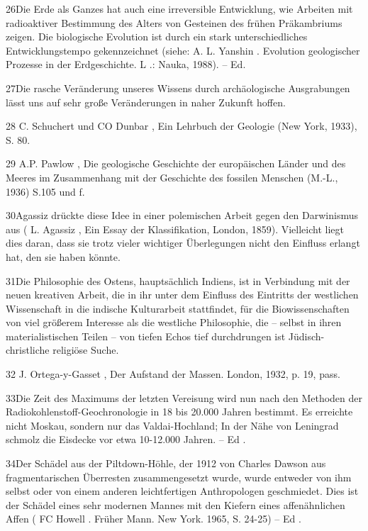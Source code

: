 \documentclass[11pt,a4paper]{book}
\begin{document}
26Die Erde als Ganzes hat auch eine irreversible Entwicklung, wie Arbeiten mit radioaktiver Bestimmung des Alters von Gesteinen des frühen Präkambriums zeigen. Die biologische Evolution ist durch ein stark unterschiedliches Entwicklungstempo gekennzeichnet (siehe: A. L. Yanshin . Evolution geologischer Prozesse in der Erdgeschichte. L .: Nauka, 1988). -- Ed.



27Die rasche Veränderung unseres Wissens durch archäologische Ausgrabungen lässt uns auf sehr große Veränderungen in naher Zukunft hoffen.



28 C. Schuchert und CO Dunbar , Ein Lehrbuch der Geologie (New York, 1933), S. 80.



29 A.P. Pawlow , Die geologische Geschichte der europäischen Länder und des Meeres im Zusammenhang mit der Geschichte des fossilen Menschen (M.-L., 1936) S.105 und f.



30Agassiz drückte diese Idee in einer polemischen Arbeit gegen den Darwinismus aus ( L. Agassiz , Ein Essay der Klassifikation, London, 1859). Vielleicht liegt dies daran, dass sie trotz vieler wichtiger Überlegungen nicht den Einfluss erlangt hat, den sie haben könnte.



31Die Philosophie des Ostens, hauptsächlich Indiens, ist in Verbindung mit der neuen kreativen Arbeit, die in ihr unter dem Einfluss des Eintritts der westlichen Wissenschaft in die indische Kulturarbeit stattfindet, für die Biowissenschaften von viel größerem Interesse als die westliche Philosophie, die -- selbst in ihren materialistischen Teilen -- von tiefen Echos tief durchdrungen ist Jüdisch-christliche religiöse Suche.



32 J. Ortega-y-Gasset , Der Aufstand der Massen. London, 1932, p. 19, pass.



33Die Zeit des Maximums der letzten Vereisung wird nun nach den Methoden der Radiokohlenstoff-Geochronologie in 18 bis 20.000 Jahren bestimmt. Es erreichte nicht Moskau, sondern nur das Valdai-Hochland; In der Nähe von Leningrad schmolz die Eisdecke vor etwa 10-12.000 Jahren. -- Ed .



34Der Schädel aus der Piltdown-Höhle, der 1912 von Charles Dawson aus fragmentarischen Überresten zusammengesetzt wurde, wurde entweder von ihm selbst oder von einem anderen leichtfertigen Anthropologen geschmiedet. Dies ist der Schädel eines sehr modernen Mannes mit den Kiefern eines affenähnlichen Affen ( FC Howell . Früher Mann. New York. 1965, S. 24-25) -- Ed .
\end{document}
